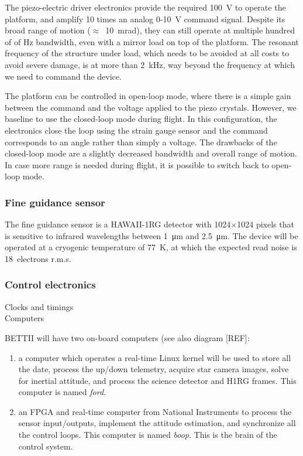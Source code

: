The piezo-electric driver electronics provide the required \SI{100}{\volt} to operate the platform, and amplify 10 times an analog 0-10~\si{\volt} command signal. Despite its broad range of motion ($\approx$~\SI{10}{\milli\radian}), they can still operate at multiple hundred of of \si{\hertz} bandwidth, even with a mirror load on top of the platform. The resonant frequency of the structure under load, which needs to be avoided at all costs to avoid severe damage, is at more than \SI{2}{\kilo\hertz}, way beyond the frequency at which we need to command the device.

The platform can be controlled in open-loop mode, where there is a simple gain between the command and the voltage applied to the piezo crystals. However, we baseline to use the closed-loop mode during flight. In this configuration, the electronics close the loop using the strain gauge sensor and the command corresponds to an angle rather than simply a voltage. The drawbacks of the closed-loop mode are a slightly decreased bandwidth and overall range of motion. In case more range is needed during flight, it is possible to switch back to open-loop mode. 


 
 
\subsubsection{Fine guidance sensor}

The fine guidance sensor is a HAWAII-1RG detector with 1024$\times$1024 pixels that is sensitive to infrared wavelengths between \SI{1}{\um} and \SI{2.5}{\um}. The device will be operated at a cryogenic temperature of \SI{77}{\kelvin}, at which the expected read noise is 18~electrons r.m.s.

\subsubsection{Control electronics}
Clocks and timings \\
Computers

BETTII will have two on-board computers (see also diagram [REF]: 
\begin{enumerate}
\item a computer which operates a real-time Linux kernel will be used to store all the date, process the up/down telemetry, acquire star camera images, solve for inertial attitude, and process the science detector and H1RG frames. This computer is named \textit{ford}.
\item an FPGA and real-time computer from National Instruments to process the sensor input/outputs, implement the attitude estimation, and synchronize all the control loops. This computer is named \textit{boop}. This is the brain of the control system. 
\end{enumerate}

